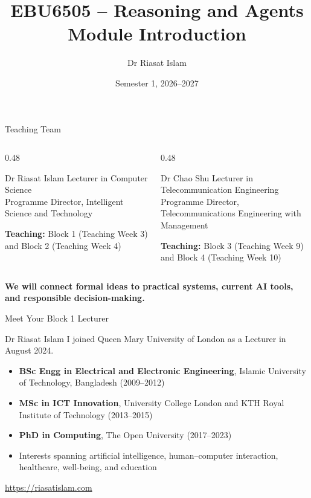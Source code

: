 \documentclass[aspectratio=169]{beamer}
\title[EBU6505 Module Introduction]{EBU6505 -- Reasoning and Agents\\Module Introduction}
\author{Dr Riasat Islam}
\institute{Queen Mary University of London}
\date{Semester 1, 2026--2027}
\begin{document}
\begin{frame}
  \titlepage
\end{frame}

\begin{frame}{Teaching Team}
\begin{columns}[T]
  \begin{column}{0.48\textwidth}
    \begin{block}{Dr Riasat Islam}
    Lecturer in Computer Science\\
    Programme Director, Intelligent Science and Technology

    \vspace{0.15cm}
    \textbf{Teaching:} Block 1 (Teaching Week 3) and Block 2 (Teaching Week 4)
    \end{block}
  \end{column}
  \begin{column}{0.48\textwidth}
    \begin{block}{Dr Chao Shu}
    Lecturer in Telecommunication Engineering\\
    Programme Director, Telecommunications Engineering with Management

    \vspace{0.15cm}
    \textbf{Teaching:} Block 3 (Teaching Week 9) and Block 4 (Teaching Week 10)
    \end{block}
  \end{column}
\end{columns}

\vspace{0.4cm}
\begin{center}
  \textbf{We will connect formal ideas to practical systems, current AI tools, and responsible decision-making.}
\end{center}
\end{frame}

\begin{frame}{Meet Your Block 1 Lecturer}
\begin{block}{Dr Riasat Islam}
I joined Queen Mary University of London as a Lecturer in August 2024.
\end{block}

\begin{itemize}
  \item \textbf{BSc Engg in Electrical and Electronic Engineering}, Islamic University of Technology, Bangladesh (2009--2012)
  \item \textbf{MSc in ICT Innovation}, University College London and KTH Royal Institute of Technology (2013--2015)
  \item \textbf{PhD in Computing}, The Open University (2017--2023)
  \item Interests spanning artificial intelligence, human--computer interaction, healthcare, well-being, and education
\end{itemize}

\vspace{0.2cm}
\begin{center}
\small\url{https://riasatislam.com}
\end{center}
\end{frame}
\end{document}

